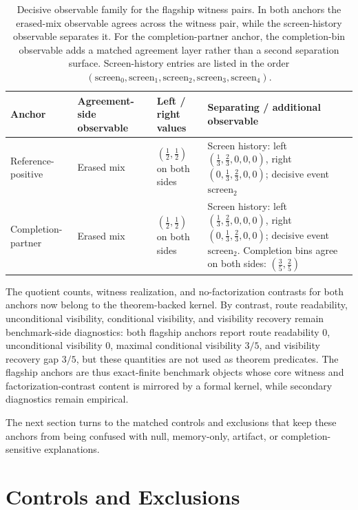 \documentclass[11pt]{article}
\theoremstyle{definition}
\begin{document}
\begin{table}[t]
\centering
\small
\caption{Decisive observable family for the flagship witness pairs. In both anchors the erased-mix observable agrees across the witness pair, while the screen-history observable separates it. For the completion-partner anchor, the completion-bin observable adds a matched agreement layer rather than a second separation surface. Screen-history entries are listed in the order $(\mathrm{screen}_0,\mathrm{screen}_1,\mathrm{screen}_2,\mathrm{screen}_3,\mathrm{screen}_4)$.}
\label{tab:flagship-witness-observables}
\begin{tabular}{p{2.8cm}p{2.6cm}p{2.6cm}p{3.6cm}}
\toprule
Anchor & Agreement-side observable & Left / right values & Separating / additional observable \\
\midrule
Reference-positive &
Erased mix &
$(\tfrac12,\tfrac12)$ on both sides &
Screen history:
left $(\tfrac13,\tfrac23,0,0,0)$,
right $(0,\tfrac13,\tfrac23,0,0)$;
decisive event $\mathrm{screen}_2$ \\
\addlinespace
Completion-partner &
Erased mix &
$(\tfrac12,\tfrac12)$ on both sides &
Screen history:
left $(\tfrac13,\tfrac23,0,0,0)$,
right $(0,\tfrac13,\tfrac23,0,0)$;
decisive event $\mathrm{screen}_2$.
Completion bins agree on both sides:
$(\tfrac35,\tfrac25)$ \\
\bottomrule
\end{tabular}
\end{table}
 
The quotient counts, witness realization, and no-factorization contrasts for both anchors now belong to the theorem-backed kernel. By contrast, route readability, unconditional visibility, conditional visibility, and visibility recovery remain benchmark-side diagnostics: both flagship anchors report route readability \(0\), unconditional visibility \(0\), maximal conditional visibility \(3/5\), and visibility recovery gap \(3/5\), but these quantities are not used as theorem predicates. The flagship anchors are thus exact-finite benchmark objects whose core witness and factorization-contrast content is mirrored by a formal kernel, while secondary diagnostics remain empirical.

The next section turns to the matched controls and exclusions that keep these anchors from being confused with null, memory-only, artifact, or completion-sensitive explanations.

\section{Controls and Exclusions}
\end{document}
